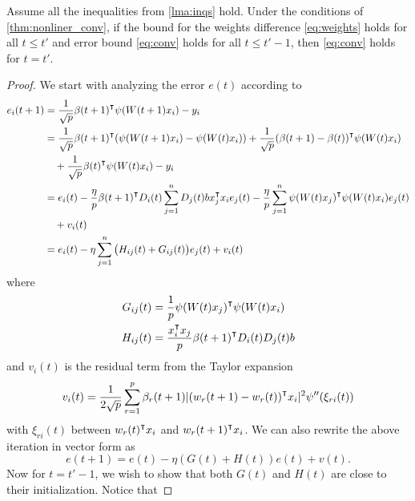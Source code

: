 \begin{lemma}
\label{lma:induction}
Assume all the inequalities from \cref{lma:inqs} hold. Under the conditions of \cref{thm:nonliner_conv}, if the bound for the weights difference \eqref{eq:weights} holds for all $t\leq t'$ and error bound \eqref{eq:conv} holds for all $t\leq t'-1$, then \eqref{eq:conv} holds for $t=t'$.
\end{lemma}
\begin{proof}
We start with analyzing the error $e(t)$ according to
\begin{equation*}
\begin{aligned}
    e_i(t+1)
    &= \frac{1}{\sqrt p}\beta(t+1)\transpose\psi(W(t+1)x_i) - y_i \\
    &= \frac{1}{\sqrt p}\beta(t+1)\transpose(\psi(W(t+1)x_i)-\psi(W(t)x_i))+ \frac{1}{\sqrt p}(\beta(t+1)-\beta(t))\transpose \psi(W(t)x_i) \\
    & \quad + \frac{1}{\sqrt p}\beta(t)\transpose \psi(W(t)x_i) - y_i \\
    &=e_i(t) - \frac{\eta}{p}\beta(t+1)\transpose D_i(t)\sum_{j=1}^nD_j(t)b x_j\transpose x_i e_j(t)  - \frac{\eta}{p}\sum_{j=1}^n\psi(W(t)x_j)\transpose\psi(W(t)x_i)e_j(t) \\
    & \quad + v_i(t) \\
    & = e_i(t)-\eta\sum_{j=1}^n\big(H_{ij}(t)+G_{ij}(t)\big)e_j(t) + v_i(t)
\end{aligned}
\end{equation*}
where
\begin{equation*}
\begin{aligned}
G_{ij}(t) &= \frac{1}{p}\psi(W(t)x_j)\transpose\psi(W(t)x_i) \\
H_{ij}(t) &= \frac{x_i\transpose x_j}{p}\beta(t+1)\transpose D_i(t)D_j(t)b
\end{aligned}
\end{equation*}
and $v_i(t)$ is the residual term from the Taylor expansion
\begin{equation*}
    v_i(t) = \frac{1}{2\sqrt p}\sum_{r=1}^p\beta_r(t+1)|(w_r(t+1)-w_r(t))\transpose x_i|^2\psi''(\xi_{ri}(t))
\end{equation*}
with $\xi_{ri}(t)$ between $w_r(t)\transpose x_i$ and $w_r(t+1)\transpose x_i$. We can also rewrite the above iteration in vector form as
\begin{equation}\label{eq:et_iter}
     e(t+1) = e(t) - \eta(G(t)+H(t))e(t) + v(t).
\end{equation}
Now for $t=t'-1$, we wish to show that both $G(t)$ and $H(t)$ are close to their initialization. Notice that

\end{proof}
